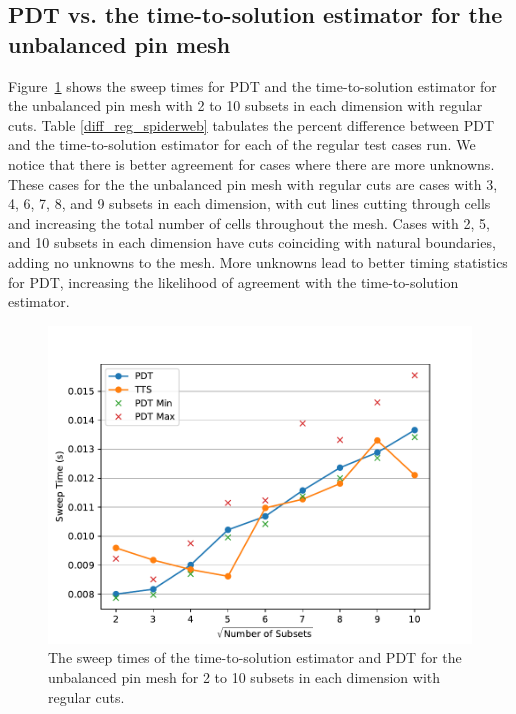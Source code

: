 \subsection{PDT vs. the time-to-solution estimator for the unbalanced pin mesh}
Figure~\ref{comp_reg_spiderweb} shows the sweep times for PDT and the time-to-solution estimator for the unbalanced pin mesh with 2 to 10 subsets in each dimension with regular cuts.
Table \ref{diff_reg_spiderweb} tabulates the percent difference between PDT and the time-to-solution estimator for each of the regular test cases run.
We notice that there is better agreement for cases where there are more unknowns.
These cases for the the unbalanced pin mesh with regular cuts are cases with 3, 4, 6, 7, 8, and 9 subsets in each dimension, with cut lines cutting through cells and increasing the total number of cells throughout the mesh.
Cases with 2, 5, and 10 subsets in each dimension have cuts coinciding with natural boundaries, adding no unknowns to the mesh.
More unknowns lead to better timing statistics for PDT, increasing the likelihood of agreement with the time-to-solution estimator.
\begin{figure}[!ht]
\centering
\includegraphics[scale=0.75]{../../figures/spiderweb_reg_pdtvtts.pdf}
\caption{The sweep times of the time-to-solution estimator and PDT for the unbalanced pin mesh for 2 to 10 subsets in each dimension with regular cuts.}
\label{comp_reg_spiderweb}
\end{figure}
